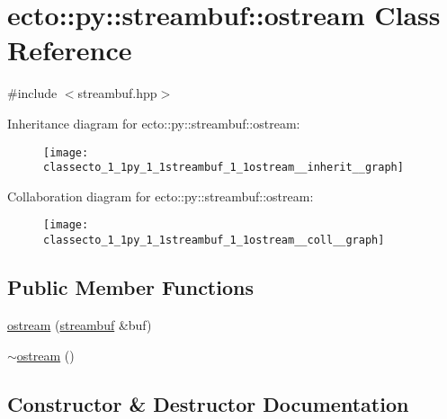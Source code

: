 \hypertarget{classecto_1_1py_1_1streambuf_1_1ostream}{}\section{ecto\+:\+:py\+:\+:streambuf\+:\+:ostream Class Reference}
\label{classecto_1_1py_1_1streambuf_1_1ostream}


{\ttfamily \#include $<$streambuf.\+hpp$>$}



Inheritance diagram for ecto\+:\+:py\+:\+:streambuf\+:\+:ostream\+:\nopagebreak
\begin{figure}[H]
\begin{center}
\leavevmode
\texttt{[image: classecto\_1\_1py\_1\_1streambuf\_1\_1ostream\_\_inherit\_\_graph]}
\end{center}
\end{figure}


Collaboration diagram for ecto\+:\+:py\+:\+:streambuf\+:\+:ostream\+:\nopagebreak
\begin{figure}[H]
\begin{center}
\leavevmode
\texttt{[image: classecto\_1\_1py\_1\_1streambuf\_1\_1ostream\_\_coll\_\_graph]}
\end{center}
\end{figure}
\subsection*{Public Member Functions}
\begin{DoxyCompactItemize}
\item 
\hyperlink{classecto_1_1py_1_1streambuf_1_1ostream_ab62cdec76b066fa4492b032dd1533bc5}{ostream} (\hyperlink{classecto_1_1py_1_1streambuf}{streambuf} \&buf)
\item 
\hyperlink{classecto_1_1py_1_1streambuf_1_1ostream_abeaab4a21b07a3bbf944d4ce8693a7b5}{$\sim$ostream} ()
\end{DoxyCompactItemize}


\subsection{Constructor \& Destructor Documentation}
